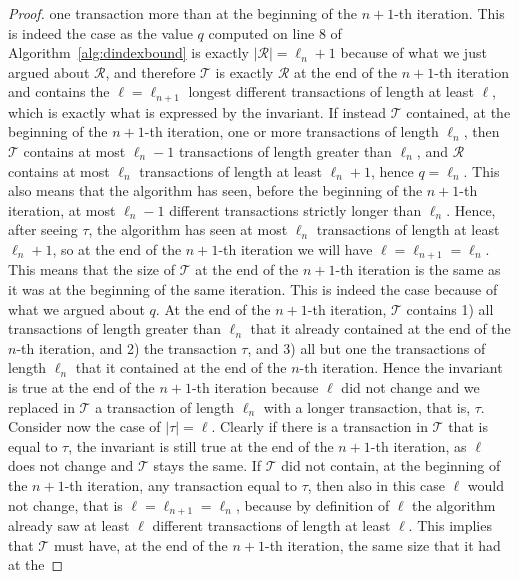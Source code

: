 \begin{proof}
  one transaction more than at the beginning of the $n+1$-th iteration. This is
  indeed the case as the value $q$ computed on line 8 of
  Algorithm~\ref{alg:dindexbound} is exactly $|\mathcal{R}|=\ell_n+1$
  because of what we just argued about $\mathcal{R}$, and therefore
  $\mathcal{T}$ is exactly $\mathcal{R}$ at the end of the $n+1$-th iteration and
  contains the $\ell=\ell_{n+1}$ longest different transactions of length at
  least $\ell$, which is exactly what is expressed by the invariant. If instead
  $\mathcal{T}$ contained, at the beginning of the $n+1$-th iteration, one or more
  transactions of length $\ell_n$, then $\mathcal{T}$ contains at most
  $\ell_n-1$ transactions of length greater than $\ell_n$, and $\mathcal{R}$
  contains at most $\ell_n$ transactions of length at least $\ell_n+1$, hence
  $q=\ell_n$. This also means that the algorithm has seen, before the beginning
  of the $n+1$-th iteration, at most $\ell_n-1$ different transactions strictly longer
  than $\ell_n$. Hence, after seeing $\tau$, the algorithm has seen at most
  $\ell_n$ transactions of length at least $\ell_n+1$,  so at the end of the
  $n+1$-th iteration we will have $\ell=\ell_{n+1}=\ell_n$. This means that the
  size of $\mathcal{T}$ at the end of the $n+1$-th iteration is the same as it
  was at the beginning of the same iteration. This is indeed the case because of
  what we argued about $q$. At the end of the $n+1$-th iteration, $\mathcal{T}$
  contains 1) all transactions of length greater than $\ell_n$ that it already
  contained at the end of the $n$-th iteration, and 2) the transaction $\tau$, and
  3) all but one the transactions of length $\ell_n$ that it contained at the
  end of the $n$-th iteration. Hence the invariant is true at the end of the
  $n+1$-th iteration because $\ell$ did not change and we replaced in
  $\mathcal{T}$ a transaction of length $\ell_n$ with a longer transaction,
  that is, $\tau$. Consider now the case of $|\tau|=\ell$. Clearly if there is
  a transaction in $\mathcal{T}$ that is equal to $\tau$, the invariant is still
  true at the end of the $n+1$-th iteration, as $\ell$ does not change and
  $\mathcal{T}$ stays the same. If $\mathcal{T}$ did not contain, at the
  beginning of the $n+1$-th iteration, any transaction equal to $\tau$, then also in this case
  $\ell$ would not change, that is $\ell=\ell_{n+1}=\ell_n$, because by
  definition of $\ell$ the algorithm already saw at least $\ell$ different
  transactions of length at least $\ell$. This implies that $\mathcal{T}$ must
  have, at the end of the $n+1$-th iteration, the same size that it had at the

\end{proof}
